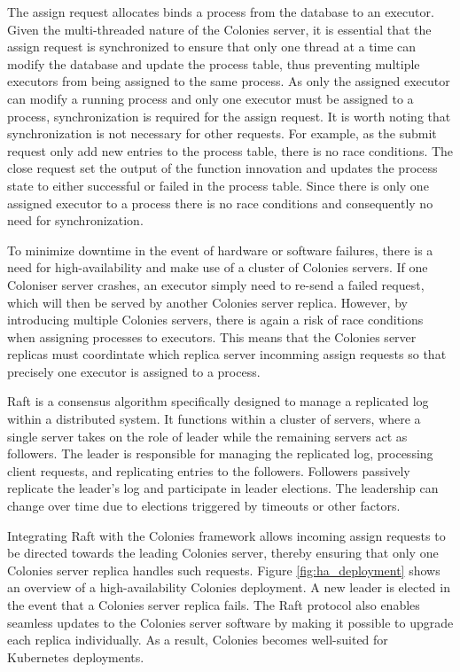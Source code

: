\documentclass{article}
\begin{document}
The assign request allocates binds a process from the database to an executor. Given the multi-threaded nature of the Colonies server, it is essential that the assign request is synchronized to ensure that only one thread at a time can modify the database and update the process table, thus preventing multiple executors from being assigned to the same process. As only the assigned executor can modify a running process and only one executor must be assigned to a process, synchronization is required for the assign request. It is worth noting that synchronization is not necessary for other requests. For example, as the submit request only add new entries to the process table, there is no race conditions. The close request set the output of the function innovation and updates the process state to either successful or failed in the process table. Since there is only one assigned executor to a process there is no race conditions and consequently no need for synchronization.

To minimize downtime in the event of hardware or software failures, there is a need for high-availability and make use of a cluster of Colonies servers. If one Coloniser server crashes, an executor simply need to re-send a failed request, which will then be served by another Colonies server replica. However, by introducing multiple Colonies servers, there is again a risk of race conditions when assigning processes to executors. This means that the Colonies server replicas must coordintate which replica server incomming assign requests so that precisely one executor is assigned to a process.

Raft \cite{raft} is a consensus algorithm specifically designed to manage a replicated log within a distributed system. It functions within a cluster of servers, where a single server takes on the role of leader while the remaining servers act as followers. The leader is responsible for managing the replicated log, processing client requests, and replicating entries to the followers. Followers passively replicate the leader's log and participate in leader elections. The leadership can change over time due to elections triggered by timeouts or other factors.

Integrating Raft with the Colonies framework allows incoming assign requests to be directed towards the leading Colonies server, thereby ensuring that only one Colonies server replica handles such requests. Figure \ref{fig:ha_deployment} shows an overview of a high-availability Colonies deployment. A new leader is elected in the event that a Colonies server replica fails. The Raft protocol also enables seamless updates to the Colonies server software by making it possible to upgrade each replica individually. As a result, Colonies becomes well-suited for Kubernetes deployments.
\end{document}
